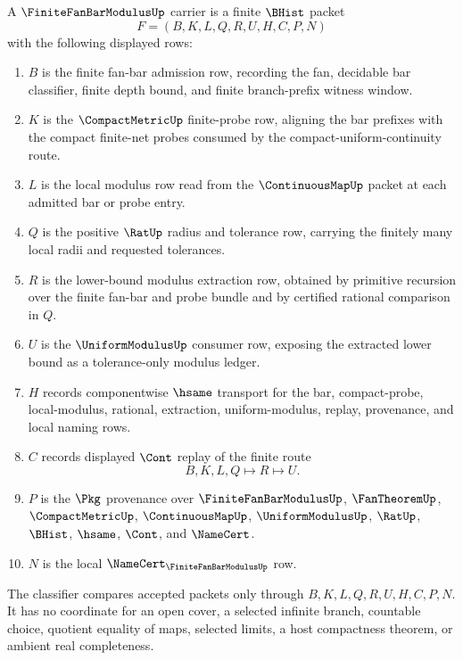 \begin{definition}
\label{def:finite-fan-bar-modulus-carrier}
A $\FiniteFanBarModulusUp$ carrier is a finite $\BHist$ packet
$$
F=(B,K,L,Q,R,U,H,C,P,N)
$$
with the following displayed rows:
\begin{enumerate}
\item $B$ is the finite fan-bar admission row, recording the fan, decidable bar classifier, finite depth bound, and finite branch-prefix witness window.
\item $K$ is the $\CompactMetricUp$ finite-probe row, aligning the bar prefixes with the compact finite-net probes consumed by the compact-uniform-continuity route.
\item $L$ is the local modulus row read from the $\ContinuousMapUp$ packet at each admitted bar or probe entry.
\item $Q$ is the positive $\RatUp$ radius and tolerance row, carrying the finitely many local radii and requested tolerances.
\item $R$ is the lower-bound modulus extraction row, obtained by primitive recursion over the finite fan-bar and probe bundle and by certified rational comparison in $Q$.
\item $U$ is the $\UniformModulusUp$ consumer row, exposing the extracted lower bound as a tolerance-only modulus ledger.
\item $H$ records componentwise $\hsame$ transport for the bar, compact-probe, local-modulus, rational, extraction, uniform-modulus, replay, provenance, and local naming rows.
\item $C$ records displayed $\Cont$ replay of the finite route
$$
B,K,L,Q \longmapsto R \longmapsto U .
$$
\item $P$ is the $\Pkg$ provenance over $\FiniteFanBarModulusUp$, $\FanTheoremUp$, $\CompactMetricUp$, $\ContinuousMapUp$, $\UniformModulusUp$, $\RatUp$, $\BHist$, $\hsame$, $\Cont$, and $\NameCert$.
\item $N$ is the local $\NameCert_{\FiniteFanBarModulusUp}$ row.
\end{enumerate}
The classifier compares accepted packets only through $B,K,L,Q,R,U,H,C,P,N$. It has no coordinate for an open cover, a selected infinite branch, countable choice, quotient equality of maps, selected limits, a host compactness theorem, or ambient real completeness.
\end{definition}


